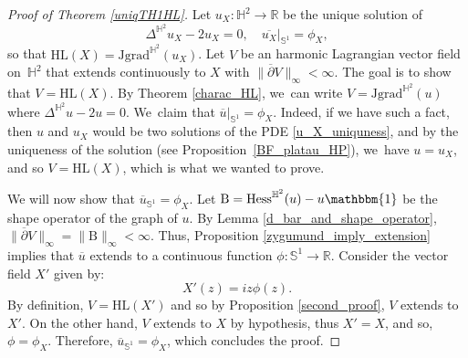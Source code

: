 \documentclass[JEP,XML,SOM,Unicode,NoEqCountersInSection, NoFloatCountersInSection,published]{cedram}
\theoremstyle{plain}
\theoremstyle{definition}
\newcommand{\grad}{\mathrm{grad}^{\mathbb{H}^2}}
\newcommand{\hess}{\mathrm{Hess}^{\mathbb{H}^2}}
\newcommand{\J}{\mathrm{J}}
\newcommand{\B}{\mathrm{B}}
\begin{document}
\begin{proof}[Proof of Theorem \ref{uniqTH1HL}]
Let $u_X:\mathbb{H}^2\to\mathbb{R}$ be the unique solution of
\begin{equation}\label{u_X_uniquness}
\Delta^{\mathbb{H}^2} u_X-2u_X=0, \quad
\overline{u_X}|_{\mathbb{S}^1}=\phi_X,
\end{equation}
so that $\mathrm{HL}(X)=\J\grad(u_X)$.
Let $V$ be an harmonic Lagrangian vector field on~$\mathbb{H}^2$ that extends continuously to $X$ with $\lVert\overline{\partial}V\rVert_{\infty}\!<\! \infty$. The goal is to show that $V\!=\!\mathrm{HL}(X)$. By Theorem \ref{charac_HL}, we~can write $V=\J\grad(u)$ where $\Delta^{\mathbb{H}^2}u-2u=0$. We~claim that $\overline{u}|_{\mathbb{S}^1}=\phi_X$. Indeed, if we have such a fact, then $u$ and $u_X$ would be two solutions of the PDE \eqref{u_X_uniquness}, and by the uniqueness of the solution (see Proposition~\ref{BF_platau_HP}), we~have $u=u_X$, and so $V=\mathrm{HL}(X)$, which is what we wanted to prove.

We will now show that $\overline{u}_{\mathbb{S}^1}=\phi_X$. Let $\B=\hess(u)-u\mathbbm{1}$ be the shape operator of the graph of $u$. By Lemma \ref{d_bar_and_shape_operator}, $\lVert\overline{\partial} V\rVert_{\infty}=\lVert \B\rVert_{\infty}<\infty$. Thus, Proposition \ref{zygumund_imply_extension} implies that $\overline{u}$ extends to a continuous function $\phi:\mathbb{S}^1\to\mathbb{R}$. Consider the vector field $X'$ given by:
\[
X'(z)=iz\phi(z).
\]
By definition, $V=\mathrm{HL}(X')$ and so by Proposition \ref{second_proof}, $V$ extends to $X'$. On the other hand, $V$ extends to $X$ by hypothesis, thus $X'=X$, and so, $\phi=\phi_X$. Therefore, $\overline{u}_{\mathbb{S}^1}=\phi_X$, which concludes the proof.
\end{proof}
\end{document}
